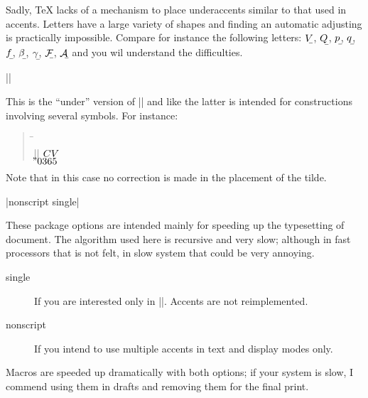 \documentclass{ltxguide}
\newenvironment{sample}{\begin{quote}\small\begin{tabbing}%
  \hskip14pc\=\hskip6pc\\}
  {\end{tabbing}\end{quote}}
\begin{document}
Sadly, \TeX{} lacks of a mechanism to place underaccents similar to 
that used in accents.  Letters have a large variety of shapes and 
finding an automatic adjusting is practically impossible.  Compare for 
instance the following letters:
\begingroup
\def\\{\underaccent{\bar}}%
$\\V$, $\\Q$, $\\p$, $\\q$, $\\f$,
$\\\beta$, $\\\gamma$, $\\{\mathcal{F}}$, $\\{\mathcal{A}}$
\endgroup
and you wil understand the difficulties.

\begin{decl}
||
\end{decl}

This is the ``under'' version of |\widetilde| and like the latter is intended for constructions
involving several symbols. For instance:
\begin{sample}
|| \> $\undertilde{CV}$
\end{sample}
Note that in this case no correction is made in the placement of the tilde.

\begin{decl}
|nonscript single|
\end{decl}

These package options are intended mainly for speeding up the 
typesetting of document.  The algorithm used here is recursive and 
very slow; although in fast processors that is not felt, in slow 
system that could be very annoying.

\begin{description}
\item[single] If you are interested only in |\accentset|.
 Accents are not reimplemented.
\item[nonscript] If you intend to use multiple accents in
 text and display modes only.
\end{description}

Macros are speeded up dramatically with both options; if your system is slow,
I commend using them in drafts and removing them for the final print.
\end{document}
